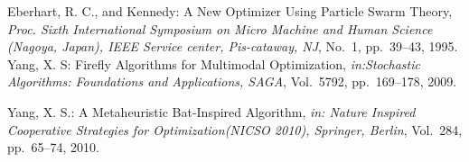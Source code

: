 \documentclass{ies2018}
\begin{document}
\begin{thebibliography}{99}
Eberhart, R. C., and Kennedy: A New Optimizer Using Particle Swarm Theory,
\textit{Proc. Sixth International Symposium on Micro Machine and Human Science (Nagoya, Japan), IEEE Service center, Pis-cataway, NJ}, No.~1, pp.~39--43, 1995.
Yang, X. S: Firefly Algorithms for Multimodal Optimization,
\textit{in:Stochastic Algorithms: Foundations and Applications, SAGA}, Vol.~5792, pp.~169--178, 2009.

Yang, X. S.: A Metaheuristic Bat-Inspired Algorithm,
 \textit{in: Nature Inspired Cooperative Strategies for Optimization(NICSO 2010), Springer, Berlin}, Vol.~284, pp.~65--74, 2010.





\end{thebibliography}
\end{document}
